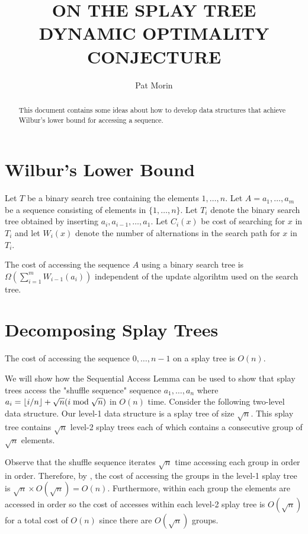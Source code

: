 \documentclass[charterfonts,lotsofwhite]{patmorin}
\title{\MakeUppercase{On the Splay Tree Dynamic Optimality Conjecture}}
\author{Pat Morin}
\date{}
\begin{document}
\maketitle

\begin{abstract}
This document contains some ideas about how to develop data structures
that achieve Wilbur's lower bound for accessing a sequence.
\end{abstract}


\section{Wilbur's Lower Bound}

Let $T$ be a binary search tree containing the elements $1,\ldots,n$.
Let $A=a_1,\ldots,a_m$ be a sequence consisting of elements in
$\{1,\ldots,n\}$.  Let $T_i$ denote the binary search tree obtained by
inserting $a_i,a_{i-1},\ldots,a_1$.  Let $C_i(x)$ be cost of searching
for $x$ in $T_i$ and let $W_i(x)$ denote the number of alternations in
the search path for $x$ in $T_i$.

\begin{thm}
The cost of accessing the sequence $A$ using a binary search tree is
$\Omega(\sum_{i=1}^{m} W_{i-1}(a_i))$ independent of the update
algorihtm used on the search tree.
\end{thm}

\section{Decomposing Splay Trees}


\begin{lem}
The cost of accessing the sequence $0,\ldots,n-1$ on a splay tree is $O(n)$.
\end{lem}

We will show how the Sequential Access Lemma can be used to show that
splay trees access the "shuffle sequence" sequence $a_1,\ldots,a_n$
where $a_i=\left\lfloor i/n\right\rfloor+\sqrt{n}(i\bmod \sqrt{n})$ in $O(n)$ time.
Consider the following two-level data structure.  Our level-1 data
structure is a splay tree of size $\sqrt{n}$.  This splay tree
contains $\sqrt{n}$ level-2 splay trees each of which contains a
consecutive group of $\sqrt{n}$ elements.

Observe that the shuffle sequence iterates $\sqrt{n}$ time accessing each group
in order in order.  Therefore, by , the cost of accessing
the groups in the level-1 splay tree is $\sqrt{n}\times O(\sqrt{n})=O(n)$.
Furthermore, within each group the elements are accessed in order so the cost
of accesses within each level-2 splay tree is $O(\sqrt{n})$ for a total cost of
$O(n)$ since there are $O(\sqrt{n})$ groups.
\end{document}
